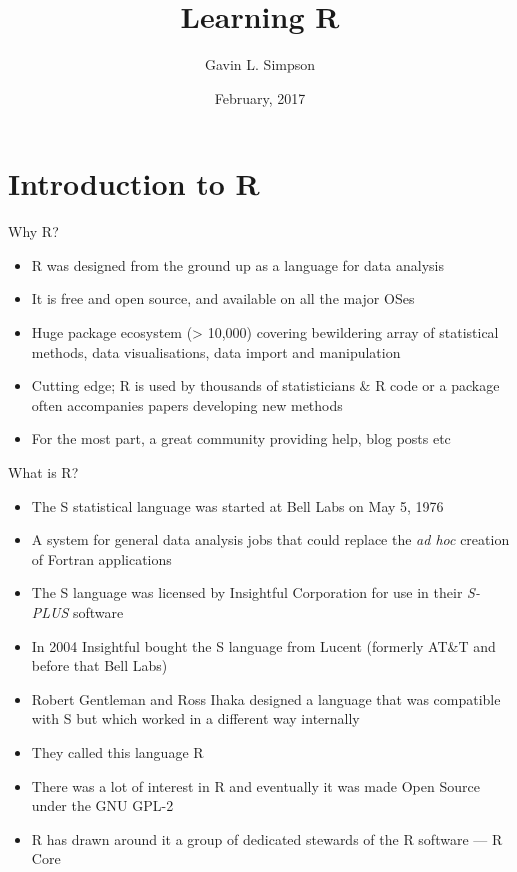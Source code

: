 \documentclass[10pt,ignorenonframetext,compress, aspectratio=169]{beamer}
\title{Learning R}
\author{Gavin L. Simpson}
\date{February, 2017}
\providecommand{\tightlist}{%
  \setlength{\itemsep}{0pt}\setlength{\parskip}{0pt}}
\begin{document}
\frame{\titlepage}

\section{Introduction to R}\label{introduction-to-r}

\begin{frame}{Why R?}

\begin{itemize}
\tightlist
\item
  R was designed from the ground up as a language for data analysis
\item
  It is free and open source, and available on all the major OSes
\item
  Huge package ecosystem (\textgreater{} 10,000) covering bewildering
  array of statistical methods, data visualisations, data import and
  manipulation
\item
  Cutting edge; R is used by thousands of statisticians \& R code or a
  package often accompanies papers developing new methods
\item
  For the most part, a great community providing help, blog posts etc
\end{itemize}

\end{frame}

\begin{frame}{What is R?}

\begin{itemize}
\tightlist
\item
  The S statistical language was started at Bell Labs on May 5, 1976
\item
  A system for general data analysis jobs that could replace the
  \emph{ad hoc} creation of Fortran applications
\item
  The S language was licensed by Insightful Corporation for use in their
  \emph{S-PLUS} software
\item
  In 2004 Insightful bought the S language from Lucent (formerly AT\&T
  and before that Bell Labs)
\item
  Robert Gentleman and Ross Ihaka designed a language that was
  compatible with S but which worked in a different way internally
\item
  They called this language R
\item
  There was a lot of interest in R and eventually it was made Open
  Source under the GNU GPL-2
\item
  R has drawn around it a group of dedicated stewards of the R software
  --- \alert{R Core}
\end{itemize}

\end{frame}
\end{document}
